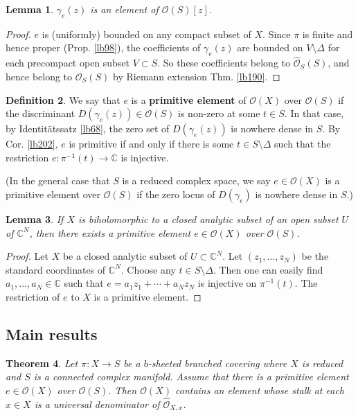 \documentclass[12pt,b5paper,notitlepage]{report}
\theoremstyle{definition}
\newtheorem{df}{Definition}[section]
\theoremstyle{plain}
\newtheorem{thm}[df]{Theorem}
\newtheorem{lm}[df]{Lemma}
\newcommand{\scr}{\mathscr}
\newcommand{\Cbb}{\mathbb C}
\newcommand{\Owht}{\widehat{\scr O}}
\numberwithin{equation}{section}
\begin{document}
\begin{lm}
$\gamma_e(z)$ is an element of $\scr O(S)[z]$.
\end{lm}

\begin{proof}
$e$ is (uniformly) bounded on any compact subset of $X$. Since $\pi$ is finite and hence proper (Prop. \ref{lb98}), the coefficients of $\gamma_e(z)$ are  bounded on $V\setminus\Delta$ for each precompact open subset $V\subset S$. So these coefficients belong to $\Owht_S(S)$, and hence belong to $\scr O_S(S)$ by Riemann extension Thm. \ref{lb190}.
\end{proof}

\begin{df}
We say that $e$ is a \textbf{primitive element}  of $\scr O(X)$ over $\scr O(S)$ if the discriminant $D(\gamma_e(z))\in\scr O(S)$ is non-zero at some $t\in S$. In that case, by Identit\"atssatz \ref{lb68}, the zero set of $D(\gamma_e(z))$ is nowhere dense in $S$. By Cor. \ref{lb202}, $e$ is primitive if and only if there is some $t\in S\setminus\Delta$ such that the restriction $e:\pi^{-1}(t)\rightarrow\Cbb$ is injective.

(In the general case that $S$ is a reduced complex space, we say $e\in\scr O(X)$ is a primitive element over $\scr O(S)$ if the zero locus of $D(\gamma_e)$ is nowhere dense in $S$.)  \hfill\qedsymbol
\end{df}

\begin{lm}\label{lb218}
If $X$ is biholomorphic to a closed analytic subset of an open subset $U$ of $\Cbb^N$, then there exists a primitive element $e\in\scr O(X)$ over $\scr O(S)$.
\end{lm}

\begin{proof}
Let $X$ be a closed analytic subset of $U\subset\Cbb^N$. Let $(z_1,\dots,z_N)$ be the standard coordinates of $\Cbb^N$. Choose any $t\in S\setminus\Delta$. Then one can easily find $a_1,\dots,a_N\in\Cbb$ such that $e=a_1z_1+\cdots+a_Nz_N$ is injective on $\pi^{-1}(t)$. The restriction of $e$ to $X$ is a primitive element.
\end{proof}


\subsection{Main results}


\begin{thm}\label{lb222}
Let $\pi:X\rightarrow S$ be a $b$-sheeted branched covering where $X$ is reduced and $S$ is a connected complex manifold. Assume that there is a primitive element $e\in\scr O(X)$ over $\scr O(S)$. Then $\scr O(X)$ contains an element whose stalk at each $x\in X$ is  a universal denominator of $\Owht_{X,x}$.
\end{thm}
\end{document}
